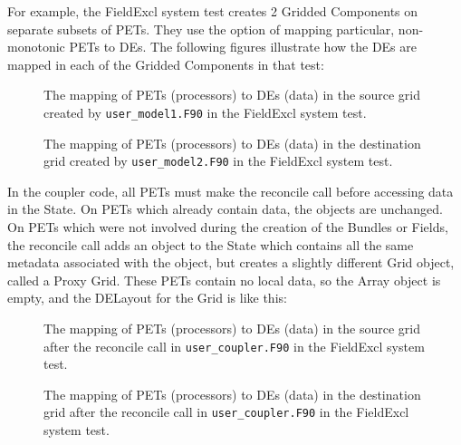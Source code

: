 \begin{enumerate}
For example, the FieldExcl system test creates 2 Gridded Components
on separate subsets of PETs.  They use the option of mapping
particular, non-monotonic PETs to DEs.  The following figures 
illustrate how the DEs are mapped in each of the Gridded Components
in that test:

\begin{center}
\begin{figure}
\caption{The mapping of PETs (processors) to DEs (data)
in the source grid created by {\tt user\_model1.F90}
in the FieldExcl system test.}
\label{fig:excl_source}
\end{figure}
\end{center}

\begin{center}
\begin{figure}
\caption{The mapping of PETs (processors) to DEs (data)
in the destination grid created by {\tt user\_model2.F90}
in the FieldExcl system test.}
\label{fig:excl_destination}
\end{figure}
\end{center}

In the coupler code, all PETs must make the reconcile call before
accessing data in the State.  On PETs which already contain data,
the objects are unchanged.  On PETs which were not involved during
the creation of the Bundles or Fields, the reconcile call adds an
object to the State which contains all the same metadata associated
with the object, but creates a slightly different Grid object,
called a Proxy Grid. These PETs contain no local data, so the
Array object is empty, and the DELayout for the Grid is like this:

\begin{center}
\begin{figure}
\caption{The mapping of PETs (processors) to DEs (data)
in the source grid after the reconcile call in {\tt user\_coupler.F90}
in the FieldExcl system test.}
\label{fig:excl_source}
\end{figure}
\end{center}

\begin{center}
\begin{figure}
\caption{The mapping of PETs (processors) to DEs (data)
in the destination grid after the reconcile call in {\tt user\_coupler.F90}
in the FieldExcl system test.}
\label{fig:excl_destination}
\end{figure}
\end{center}

\end{enumerate}
